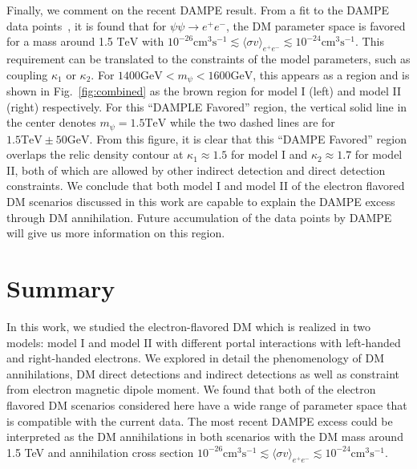\documentclass[aps,prd,letterpaper,showpacs,twocolumn,preprintnumbers,floatfix,superscriptaddress]{revtex4-1}
\begin{document}
Finally, we comment on the recent DAMPE result. %
From a fit to the DAMPE data points~\cite{Chao:2017yjg}, it is found that for $\psi \psi \rightarrow e^+ e^-$, the DM parameter space is favored for a mass around 1.5 $\text{TeV}$ with $10^{-26}  \text{cm}^3 \text{s}^{-1} \lesssim \langle \sigma v \rangle_{e^+ e^-} \lesssim 10^{-24} \text{cm}^3 \text{s}^{-1}$. 
This requirement can be translated to the constraints of the model parameters, such as coupling $\kappa_1$ or $\kappa_2$. For $1400\text{GeV}< m_{\psi} < 1600\text{GeV}$, this appears as a region and is shown in Fig.~\ref{fig:combined}
as the brown region for model I (left) and model II (right) respectively. For this ``DAMPLE Favored'' region, 
the vertical solid line in the center denotes $m_{\psi}=1.5\text{TeV}$ while the two dashed lines
are for $1.5\text{TeV} \pm 50\text{GeV}$. From this figure, it is clear that this ``DAMPE Favored'' region 
overlaps the relic density contour at $\kappa_1 \approx 1.5$ for model I and $\kappa_2 \approx 1.7$ 
for model II, both of which are allowed by other indirect detection and direct detection constraints. 
We conclude that both model I and model II of the electron flavored DM scenarios discussed in this work 
are capable to explain the DAMPE excess through DM annihilation. Future accumulation of the data points by DAMPE will give us more information on this region.


\section{Summary}
In this work, we studied the electron-flavored DM which is realized in two models: model I and model II with different portal interactions with left-handed and right-handed electrons. We explored in detail the phenomenology of DM annihilations, DM direct detections and indirect detections as well as constraint from electron magnetic dipole moment. We found that both of the electron flavored DM scenarios considered here have a wide range of parameter space that is compatible with the current data. The most recent DAMPE excess could be interpreted as the DM annihilations in both scenarios with the DM mass around 1.5 TeV and annihilation cross section $10^{-26}  \text{cm}^3 \text{s}^{-1} \lesssim \langle \sigma v \rangle_{e^+ e^-} \lesssim 10^{-24} \text{cm}^3 \text{s}^{-1}$. 
\end{document}
